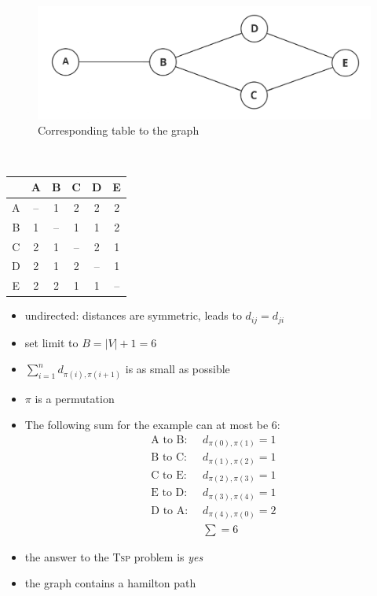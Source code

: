 \documentclass[a4]{scrartcl}
\begin{document}
\begin{minipage}{0.7\textwidth}
\begin{figure}[H]
\begin{center}
\includegraphics[scale=0.18]{tsp_1.png}
\end{center}
\caption{Corresponding table to the graph}
\end{figure}

\end{minipage}\begin{minipage}{0.05\textwidth}
\ \\
\end{minipage}\begin{minipage}{0.25\textwidth}
\begin{tabular}{c|c|c|c|c|c|}
 & A & B & C & D & E \\
\hline
A & -- & 1 & 2 & 2 & 2 \\
\hline
B & 1 & -- & 1 & 1 & 2 \\
\hline
C & 2 & 1 & -- & 2 & 1 \\
\hline
D & 2 & 1 & 2 & -- & 1 \\
\hline
E & 2 & 2 & 1 & 1 & -- \\
\hline
\end{tabular}


\end{minipage}

\begin{itemize}
\item undirected: distances are symmetric, leads to $d_{ij} = d_{ji}$
\item set limit to $B = |V|+1 = 6$
\item $\sum^{n}_{i=1} d_{\pi(i), \pi(i+1)}$ is as small as possible
\item $\pi$ is a permutation
\item[] The following sum for the example can at most be 6:
\begin{align*}
 \text{A to B: } & \  d_{\pi(0), \pi(1)} =  1 \\
  \text{B to C: } & \  d_{\pi(1), \pi(2)} = 1\\
   \text{C to E: } & \  d_{\pi(2), \pi(3)} = 1 \\
 \text{E to D: } & \  d_{\pi(3), \pi(4)} =  1\\
 \text{D to A: } & \  d_{\pi(4), \pi(0)} = 2
 \\
 & \ \sum = 6
\end{align*}
\item the answer to the \textsc{Tsp} problem is \textit{yes}
\item the graph contains a hamilton path
\end{itemize}
\end{document}

